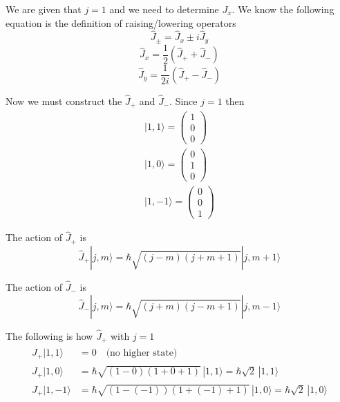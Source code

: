 \documentclass[12pt]{article}
\begin{document}
        We are given that $j = 1$ and we need to determine $J_x$. We know the following equation is the definition of raising/lowering operators
        \[
            \hat{J}_\pm = \hat{J}_x \pm i \hat{J}_y
        \]
        \begin{equation}\label{eq: jx}
            \hat{J}_x = \frac{1}{2} (\hat{J}_+ + \hat{J}_-)           
        \end{equation}
        \begin{equation} \label{eq: jy}
            \hat{J}_y = \frac{1}{2i} (\hat{J}_+ - \hat{J}_-)
        \end{equation}

        Now we must construct the $\hat{J}_+$ and $\hat{J}_-$. Since $j=1$ then
        \begin{align*}
            |1,1\rangle = \begin{pmatrix}
                1 \\ 0 \\ 0    
            \end{pmatrix} \\
            |1,0\rangle = \begin{pmatrix}
                0 \\ 1 \\ 0
            \end{pmatrix} \\
            |1,-1\rangle = \begin{pmatrix}
                0 \\ 0 \\ 1
            \end{pmatrix}
        \end{align*}

        The action of $\hat{J}_+$ is 
        \[
            \hat{J}_+ | j, m \rangle = \hbar \sqrt{(j - m)(j + m + 1)} | j, m+1 \rangle
        \]

        The action of $\hat{J}_-$ is
        \[
            \hat{J}_- | j, m \rangle = \hbar \sqrt{(j + m)(j - m + 1)} | j, m-1 \rangle
        \]

        The following is how $\hat{J}_+$ with $j=1$
        \begin{align*}
            \hat{J}_+ |1,1\rangle &= 0 \quad \text{(no higher state)} \\
            \hat{J}_+ |1,0\rangle &= \hbar \sqrt{(1-0)(1+0+1)} \, |1,1\rangle = \hbar \sqrt{2} \, |1,1\rangle \\
            \hat{J}_+ |1,-1\rangle &= \hbar \sqrt{(1-(-1))(1+(-1)+1)} \, |1,0\rangle = \hbar \sqrt{2} \, |1,0\rangle
        \end{align*}
\end{document}

